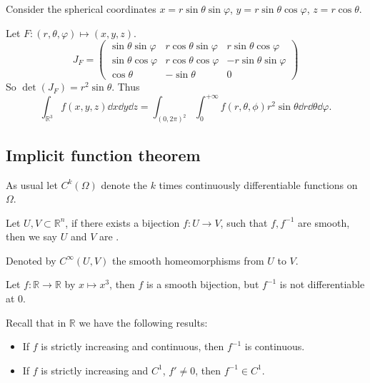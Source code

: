 \begin{example}
    Consider the spherical coordinates $x=r\sin \theta \sin \varphi$,
	$y = r\sin\theta \cos\varphi$, $z = r\cos\theta$.

	Let $F: (r,\theta,\varphi)\mapsto (x,y,z)$.
	\[
	J_F = \begin{pmatrix}
		\sin\theta\sin\varphi &r\cos\theta\sin\varphi &r\sin\theta\cos\varphi\\
		\sin\theta\cos\varphi &r\cos\theta\cos\varphi &-r\sin\theta\sin\varphi\\
		\cos\theta &-\sin\theta &0
	\end{pmatrix}
	\]
	So $\det(J_F) = r^2\sin\theta$. Thus
	\[
	\int_{\mathbb{R}^{3}} f(x,y,z)\dd x\dd y\dd z
	= \int_{(0,2\pi)^2}\int_{0}^{+\infty}
	f(r, \theta, \phi)r^2\sin\theta \dd r\dd \theta \dd \varphi.
	\]
\end{example}

\subsection{Implicit function theorem}
\label{sub:Implicit function theorem}


As usual let $C^k(\Omega)$ denote the $k$ times continuously differentiable
functions on $\Omega$.
\begin{definition}
	Let $U, V \subset \mathbb{R}^n$, if there exists a bijection $f: U\to V$,
	such that $f, f^{-1}$ are smooth, then we say $U$ and $V$ are
	.

	Denoted by $C^{\infty} (U, V)$ the smooth homeomorphisms from $U$ to $V$.
\end{definition}

\begin{example}
    Let $f: \mathbb{R}\to \mathbb{R}$ by $x\mapsto x^3$,
	then $f$ is a smooth bijection, but $f^{-1}$ is not differentiable at $0$.
\end{example}

Recall that in $\mathbb{R}$ we have the following results:
\begin{itemize}
	\item If $f$ is strictly increasing and continuous, then $f ^{-1}$ is
		continuous.
	\item If $f$ is strictly increasing and $C^1$, $f' \ne 0$,
		then $f^{-1}\in C^1$.
\end{itemize}

